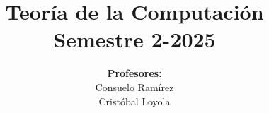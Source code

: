 \documentclass{beamer}
\begin{document}
\title[Presentación del curso]{Teoría de la Computación \\ Semestre 2-2025}
\author[Teoría de la Computación]{\textbf{Profesores:}\\ Consuelo Ramírez \\
  Cristóbal Loyola}
\date{}

\end{document}

